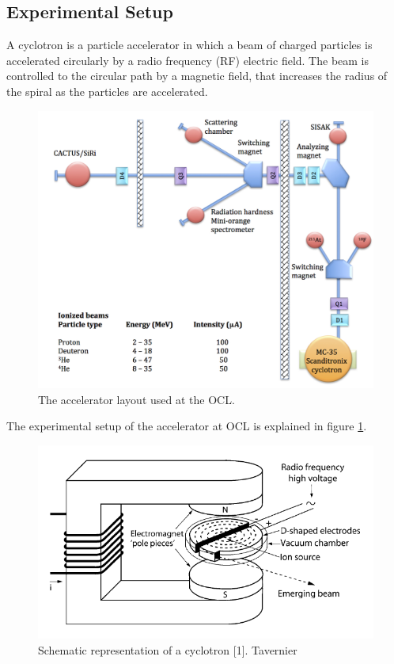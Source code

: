 \documentclass[a4paper,12pt]{article}
\begin{document}
\subsection{Experimental Setup}
A cyclotron is a particle accelerator in which a beam of charged particles
is accelerated circularly by a radio frequency (RF) electric field.
The beam is controlled to the circular path by a magnetic field,
that increases the radius of the spiral as the particles are accelerated.
\begin{figure}[h!]
    \centering
    \includegraphics[width=\columnwidth]{ocl-layout.jpg}
    \caption{The accelerator layout used at the OCL.}
    \label{fig:accelerator}
\end{figure}
The experimental setup of the accelerator at OCL is 
explained in figure \ref{fig:accelerator}. 
\begin{figure}[h!]
    \centering
    \includegraphics[width=\columnwidth]{cyclotron-schematic-tavernier.png}
    \caption{Schematic representation of a cyclotron [1]. Tavernier}
    \label{fig:cyclotron}
\end{figure}
\end{document}
